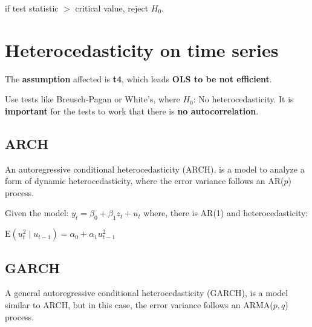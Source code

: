 \documentclass[10pt, a4paper, landscape]{article}
\newcommand{\E}{\mathrm{E}}
\begin{document}
\begin{multicols}{3}
\begin{enumerate}[leftmargin=*]
			if test statistic $>$ critical value, reject $H_0$.
		\end{enumerate}
		
		\section*{Heterocedasticity on time series}
		
		The \textbf{assumption} affected is \textbf{t4}, which leads \textbf{OLS to be not efficient}.
		
		Use tests like Breusch-Pagan or White's, where $H_{0}$: No heterocedasticity. It is \textbf{important} for the tests to work that there is \textbf{no autocorrelation}.
		
		\subsection*{ARCH}
		
		An autoregressive conditional heterocedasticity (ARCH), is a model to analyze a form of dynamic heterocedasticity, where the error variance follows an AR($p$) process.
		
		Given the model: $y_{t} = \beta_{0} + \beta_{1} z_{t} + u_{t}$ where, there is AR(1) and heterocedasticity:
		
		\begin{center}
			$\E(u^{2}_{t} \mid u_{t - 1}) = \alpha_{0} + \alpha_{1} u^{2}_{t - 1}$
		\end{center}
		
		\subsection*{GARCH}
		
		A general autoregressive conditional heterocedasticity (GARCH), is a model similar to ARCH, but in this case, the error variance follows an ARMA($p, q$) process.
	\end{multicols}
\end{document}
